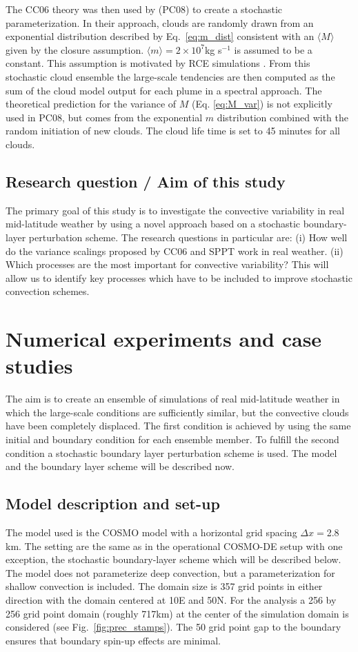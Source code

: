 \documentclass[a4paper, 12pt]{article}
\begin{document}
The CC06 theory was then used by \cite{Plant2008}(PC08) to create a stochastic parameterization. In their approach, clouds are randomly drawn from an exponential distribution described by Eq.~\ref{eq:m_dist} consistent with an $\langle M \rangle$ given by the closure assumption. $\langle m \rangle = 2 \times 10^7$kg s$^{-1}$ is assumed to be a constant. This assumption is motivated by RCE simulations \citep[e.g.][]{Cohen2006}. From this stochastic cloud ensemble the large-scale tendencies are then computed as the sum of the cloud model output for each plume in a spectral approach. The theoretical prediction for the variance of $M$ (Eq. \ref{eq:M_var}) is not explicitly used in PC08, but comes from the exponential $m$ distribution combined with the random initiation of new clouds. The cloud life time is set to 45 minutes for all clouds. 

\subsection{Research question / Aim of this study}

The primary goal of this study is to investigate the convective variability in real mid-latitude weather by using a novel approach based on a stochastic boundary-layer perturbation scheme. The research questions in particular are: (i) How well do the variance scalings proposed by CC06 and SPPT work in real weather. (ii) Which processes are the most important for convective variability? This will allow us to identify key processes which have to be included to improve stochastic convection schemes. 


\section{Numerical experiments and case studies} \label{sec:numerical}
The aim is to create an ensemble of simulations of real mid-latitude weather in which the large-scale conditions are sufficiently similar, but the convective clouds have been completely displaced. The first condition is achieved by using the same initial and boundary condition for each ensemble member. To fulfill the second condition a stochastic boundary layer perturbation scheme is used. The model and the boundary layer scheme will be described now. 

\subsection{Model description and set-up}
The model used is the COSMO model \citep{Baldauf2011} with a horizontal grid spacing $\Delta x=$2.8\,km. The setting are the same as in the operational COSMO-DE setup with one exception, the stochastic boundary-layer scheme which will be described below. The model does not parameterize deep convection, but a parameterization for shallow convection is included. The domain size is 357 grid points in either direction with the domain centered at 10E and 50N. For the analysis a 256 by 256 grid point domain (roughly 717km) at the center of the simulation domain is considered (see Fig.~\ref{fig:prec_stamps}). The 50 grid point gap to the boundary ensures that boundary spin-up effects are minimal. 
\end{document}
